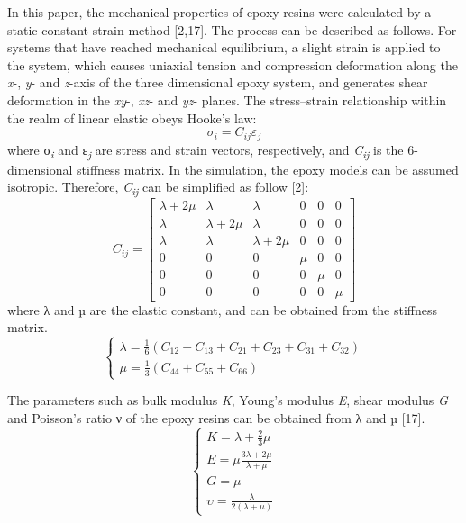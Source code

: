 \documentclass{article}
\begin{document}
In this paper, the mechanical properties of epoxy resins were calculated by a static constant strain method [2,17]. The process can be described as follows. For systems that have reached mechanical equilibrium, a slight strain is applied to the system, which causes uniaxial tension and compression deformation along the \emph{x}-, \emph{y}- and \emph{z}-axis of the three dimensional epoxy system, and generates shear deformation in the \emph{xy}-, \emph{xz}- and \emph{yz}- planes. The stress–strain relationship within the realm of linear elastic obeys Hooke’s law:
\begin{equation}
\sigma_i = C_{ij}\varepsilon_j
\tag{6}
\end{equation}
where σ\textsubscript{\emph{i}} and ε\textsubscript{\emph{j}} are stress and strain vectors, respectively, and \emph{C\textsubscript{ij}} is the 6-dimensional stiffness matrix. In the simulation, the epoxy models can be assumed isotropic. Therefore, \emph{C\textsubscript{ij}} can be simplified as follow [2]:
\begin{equation}
C_{ij} = \begin{bmatrix}
\lambda + 2\mu & \lambda & \lambda & 0 & 0 & 0 \\
\lambda & \lambda + 2\mu & \lambda & 0 & 0 & 0 \\
\lambda & \lambda & \lambda + 2\mu & 0 & 0 & 0 \\
0 & 0 & 0 & \mu & 0 & 0 \\
0 & 0 & 0 & 0 & \mu & 0 \\
0 & 0 & 0 & 0 & 0 & \mu
\end{bmatrix}
\tag{7}
\end{equation}
where λ and µ are the elastic constant, and can be obtained from the stiffness matrix.
\begin{equation}
\left\{\begin{array}{l}
\lambda = \frac{1}{6}(C_{12} + C_{13} + C_{21} + C_{23} + C_{31} + C_{32}) \\
\mu = \frac{1}{3}(C_{44} + C_{55} + C_{66})
\end{array}\right.
\tag{8}
\end{equation}

The parameters such as bulk modulus \emph{K}, Young’s modulus \emph{E}, shear modulus \emph{G} and Poisson’s ratio ν of the epoxy resins can be obtained from λ and µ [17].
\begin{equation}
\left\{\begin{array}{l}
K = \lambda + \frac{2}{3}\mu \\
E = \mu\frac{3\lambda + 2\mu}{\lambda + \mu} \\
G = \mu \\
\upsilon = \frac{\lambda}{2(\lambda + \mu)}
\end{array}\right.
\tag{9}
\end{equation}
\end{document}
